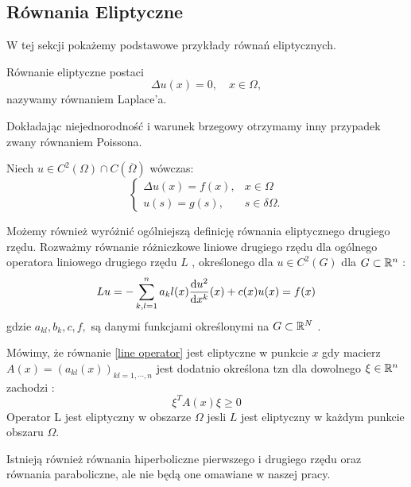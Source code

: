 \documentclass[12pt,a4paper]{report}
\begin{document}
\subsection{Równania Eliptyczne}
W tej sekcji pokażemy podstawowe przykłady równań eliptycznych. 
\begin{problem}
Równanie eliptyczne postaci 
$$
\Delta u(x) = 0, \quad x \in \Omega, 
$$
nazywamy równaniem Laplace'a.
\end{problem}
Dokładając niejednorodność i warunek brzegowy otrzymamy inny przypadek zwany równaniem Poissona.
\begin{problem}
Niech $u \in C^2(\Omega) \cap C(\overline{\Omega})$ wówczas:  
\begin{equation}
\left\{\begin{array}{ll}
\Delta u(x) = f(x), & x \in \Omega \\
u(s) = g(s),& s \in \delta \Omega.
\end{array} \right. 
\end{equation}
\end{problem}
Możemy również wyróżnić ogólniejszą definicję równania eliptycznego drugiego rzędu. Rozważmy równanie różniczkowe liniowe drugiego rzędu dla ogólnego operatora liniowego drugiego rzędu $L$ \label{line operator}, określonego dla $ u \in C^2(G)$ dla $G \subset \mathbb{R}^{n}$ : 
$$
Lu = -\sum_{k,l =1}^{n} a_kl(x) \ddx[u^2]{x^k} (x) + c(x)u(x) = f(x) 
$$
gdzie $ a_{kl}, b_{k}, c, f, $ są danymi funkcjami określonymi na $G \subset \mathbb{R}^N$ .
\begin{definition}
Mówimy, że równanie  \ref{line operator} jest eliptyczne w punkcie $x$ gdy macierz $A(x) = (a_{kl}(x))_{kl=1,\cdots,n}$ jest dodatnio określona tzn dla dowolnego $ \xi \in \mathbb{R}^{n}$ zachodzi :
$$
\xi^{T} A(x) \xi \geq 0
$$
Operator L jest eliptyczny w obszarze $\Omega$ jesli $L$ jest eliptyczny w każdym punkcie obszaru $\Omega$.
\end{definition}
Istnieją również równania hiperboliczne pierwszego i drugiego rzędu oraz równania paraboliczne, ale nie będą one omawiane w naszej pracy. 
\end{document}
